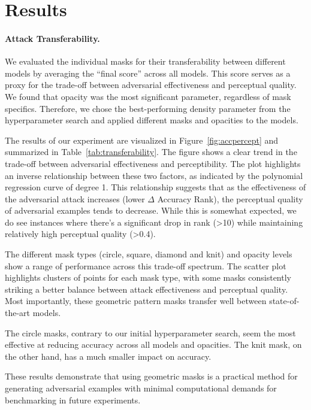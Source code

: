 \documentclass[a4paper, oneside]{discothesis}
\begin{document}
\section{Results}

\paragraph{Attack Transferability.}

We evaluated the individual masks for their transferability between different models by averaging the ``final score'' across all models. This score serves as a proxy for the trade-off between adversarial effectiveness and perceptual quality. We found that opacity was the most significant parameter, regardless of mask specifics. Therefore, we chose the best-performing density parameter from the hyperparameter search and applied different masks and opacities to the models.

The results of our experiment are visualized in Figure~\ref{fig:accpercept} and summarized in Table~\ref{tab:transferability}. The figure shows a clear trend in the trade-off between adversarial effectiveness and perceptibility. The plot highlights an inverse relationship between these two factors, as indicated by the polynomial regression curve of degree 1. This relationship suggests that as the effectiveness of the adversarial attack increases (lower $\Delta$ Accuracy Rank), the perceptual quality of adversarial examples tends to decrease. While this is somewhat expected, we do see instances where there's a significant drop in rank (>10) while maintaining relatively high perceptual quality (>0.4).

The different mask types (circle, square, diamond and knit) and opacity levels show a range of performance across this trade-off spectrum. The scatter plot highlights clusters of points for each mask type, with some masks consistently striking a better balance between attack effectiveness and perceptual quality. Most importantly, these geometric pattern masks transfer well between state-of-the-art models.

The circle masks, contrary to our initial hyperparameter search, seem the most effective at reducing accuracy across all models and opacities. The knit mask, on the other hand, has a much smaller impact on accuracy.

These results demonstrate that using geometric masks is a practical method for generating adversarial examples with minimal computational demands for benchmarking in future experiments.
\end{document}
